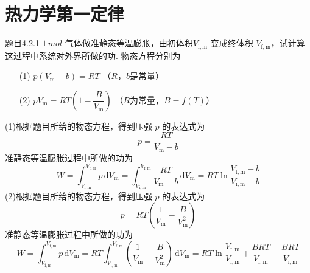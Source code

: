 \section{热力学第一定律}
\begin{question}{题目4.2.1}
    $1 \,\si{mol}$ 气体做准静态等温膨胀，由初体积$V_\mathrm{i,m}$ 变成终体积 $V_\mathrm{f,m}$，试计算这过程中系统对外界所做的功. 物态方程分别为
    \begin{enumerate}
        \item[(1)] $p(V_\mathrm{m} - b) = RT$ （$R$，$b$是常量）
        \item[(2)] $pV_\mathrm{m} = RT\left(1-\dfrac{B}{V_\mathrm{m}}\right)$ （$R$为常量，$B = f(T)$）
    \end{enumerate}
\end{question}

\begin{solution}
    (1)根据题目所给的物态方程，得到压强 $p$ 的表达式为
    $$
        p = \frac{RT}{V_\mathrm{m} - b}
    $$
    准静态等温膨胀过程中所做的功为
    $$
        W  = \int_{V_\mathrm{i,m}}^{V_\mathrm{f,m}} p \,\mathrm{d}V_\mathrm{m}
        = \int_{V_\mathrm{i,m}}^{V_\mathrm{f,m}} \frac{RT}{V_\mathrm{m} - b} \,\mathrm{d}V_\mathrm{m}
        = RT\ln\frac{V_\mathrm{f,m} - b}{V_\mathrm{i,m} - b}
    $$
    (2)根据题目所给的物态方程，得到压强 $p$ 的表达式为
    $$
        p = RT\left(\frac{1}{V_\mathrm{m}} - \frac{B}{V_\mathrm{m}^2}\right)
    $$
    准静态等温膨胀过程中所做的功为
    $$
        W  = \int_{V_\mathrm{i,m}}^{V_\mathrm{f,m}} p \,\mathrm{d}V_\mathrm{m}
        = RT \int_{V_\mathrm{i,m}}^{V_\mathrm{f,m}} \left(\frac{1}{V_\mathrm{m}} - \frac{B}{V_\mathrm{m}^2} \right) \,\mathrm{d}V_\mathrm{m}
        = RT\ln\frac{V_\mathrm{f,m}}{V_\mathrm{i,m}} + \frac{BRT}{V_\mathrm{f,m}} - \frac{BRT}{V_\mathrm{i,m}}
    $$
\end{solution}

